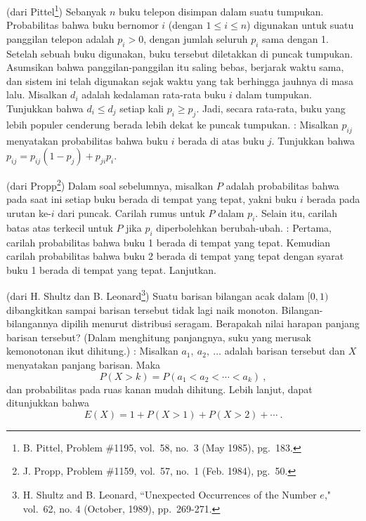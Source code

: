 \begin{LJSItem}
\istar\label{exer 6.1.39}
(dari Pittel\footnote{B. Pittel, Problem \#1195,  vol.~58,
no.\ 3 (May 1985), pg.~183.}) Sebanyak $n$ buku telepon
disimpan dalam suatu tumpukan. Probabilitas bahwa buku bernomor $i$ (dengan $1 \le i \le
n$) digunakan untuk suatu panggilan telepon adalah $p_i > 0$, dengan jumlah seluruh $p_i$ sama dengan 1. Setelah sebuah
buku digunakan, buku tersebut diletakkan di puncak tumpukan. Asumsikan bahwa panggilan-panggilan itu saling bebas,
berjarak waktu sama, dan sistem ini telah digunakan sejak waktu yang tak berhingga jauhnya di masa lalu. Misalkan
$d_i$ adalah kedalaman rata-rata buku $i$ dalam tumpukan. Tunjukkan bahwa $d_i \le d_j$ setiap kali $p_i
\ge p_j$. Jadi, secara rata-rata, buku yang lebih populer cenderung berada lebih dekat ke
puncak tumpukan. : Misalkan $p_{ij}$ menyatakan probabilitas bahwa buku $i$ berada di atas
buku $j$. Tunjukkan bahwa $p_{ij} = p_{ij}(1 - p_j) + p_{ji}p_i$.

\istar\label{exer 6.1.40}
(dari Propp\footnote{J. Propp, Problem \#1159,  vol.~57, no.\ 1
(Feb. 1984), pg.~50.}) Dalam soal sebelumnya, misalkan $P$ adalah probabilitas
bahwa pada saat ini setiap buku berada di tempat yang tepat, yakni buku $i$ berada pada urutan ke-$i$ dari
puncak. Carilah rumus untuk $P$ dalam $p_i$. Selain itu, carilah batas atas
terkecil untuk $P$ jika $p_i$ diperbolehkan berubah-ubah. : Pertama, carilah probabilitas
bahwa buku 1 berada di tempat yang tepat. Kemudian carilah probabilitas bahwa buku 2 berada di tempat yang tepat
dengan syarat buku 1 berada di tempat yang tepat. Lanjutkan.

\istar\label{exer 6.1.41}
(dari H. Shultz dan B. Leonard\footnote{H. Shultz and B. Leonard, ``Unexpected Occurrences of the
Number $e$,"
 vol.~62, no. 4 (October, 1989), pp.~269-271.}) Suatu barisan bilangan acak dalam $[0, 1)$ dibangkitkan sampai barisan tersebut
tidak lagi naik monoton. Bilangan-bilangannya dipilih menurut distribusi seragam. Berapakah
nilai harapan panjang barisan tersebut? (Dalam menghitung panjangnya, suku yang merusak
kemonotonan ikut dihitung.) : Misalkan $a_1,\ a_2,\ \ldots$ adalah barisan tersebut dan $X$ menyatakan
panjang barisan. Maka
$$P(X > k) = P(a_1 < a_2 < \cdots < a_k)\ ,$$
dan probabilitas pada ruas kanan mudah dihitung. Lebih lanjut, dapat ditunjukkan bahwa
$$E(X) = 1 + P(X > 1) + P(X > 2) + \cdots\ .$$


\end{LJSItem}
